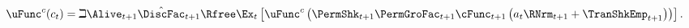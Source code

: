   \begin{equation}\begin{gathered}\begin{aligned}
        \uFunc^{{c}}({c}_{t}) & = \beth\Alive_{t+1}\hat{\DiscFac}_{t+1}\Rfree \Ex_{t}\left[\uFunc^{{c}}\left(\PermShk_{t+1}\PermGroFac_{t+1}\cFunc_{t+1}\left({a}_{t}\RNrm_{t+1}+\TranShkEmp_{t+1}\right)\right)\right]\label{eq:FOCLifeCycle}
        .
      \end{aligned}\end{gathered}\end{equation}
